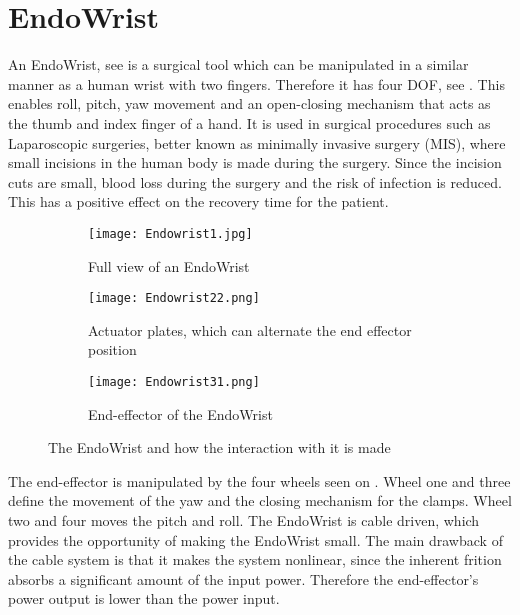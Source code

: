 \section{EndoWrist}\label{sec:Endowrist}

An EndoWrist, see  is a surgical tool which can be manipulated in a similar manner as a human wrist with two fingers. Therefore it has four \gls{DOF}, see . This enables roll, pitch, yaw movement and an open-closing mechanism that acts as the thumb and index finger of a hand.  It is used in surgical procedures such as Laparoscopic surgeries, better known as minimally invasive surgery (MIS), where small incisions in the human body is made during the surgery. Since the incision cuts are small, blood loss during the surgery and the risk of infection is reduced. This has a positive effect on the recovery time for the patient.


\begin{figure}[H]
	\centering
	\begin{subfigure}{.32\textwidth}
		\centering
		\texttt{[image: Endowrist1.jpg]}
		\caption{Full view of an EndoWrist\vspace{8.5mm}   }
		\label{fig:Endo_full}
	\end{subfigure}
	\begin{subfigure}{.32\textwidth}
		\centering
		\texttt{[image: Endowrist22.png]}
		\caption{Actuator plates, which can alternate the end effector position}
		\label{fig:Endo_plates}
	\end{subfigure}
	\begin{subfigure}{.32\textwidth}
		\centering
		\texttt{[image: Endowrist31.png]}
		\caption{End-effector of the EndoWrist\newline}
		\label{fig:Endo_end}
	\end{subfigure}
\caption{The EndoWrist and how the interaction with it is made}
\label{fig:endowrits_set}
\end{figure}


The end-effector is manipulated by the four wheels seen on . Wheel one and three define the movement of the yaw and the closing mechanism for the clamps. Wheel two and four moves the pitch and roll. The EndoWrist is cable driven, which provides the opportunity of making the EndoWrist small. The main drawback of the cable system is that it makes the system nonlinear, since the inherent frition absorbs a significant amount of the input power. Therefore the end-effector's power output is lower than the power input.